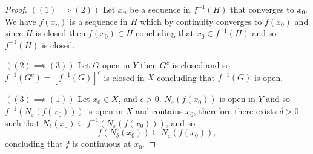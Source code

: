 \documentclass[11pt,openany]{book}
\theoremstyle{plain}
\theoremstyle{definition}
\theoremstyle{remark}
\newcommand{\eps}{\varepsilon}
\begin{document}
\begin{proof}
    $((1)\implies (2))$ 
    Let $x_n$ be a sequence in $f^{-1}(H)$ that converges to $x_0$. We have $f(x_n)$ is a sequence in $H$ which by continuity converges to $f(x_0)$ and since $H$ is closed then $f(x_0)\in H$ concluding that $x_0\in f^{-1}(H)$ and so $f^{-1}(H)$ is closed.

    $((2)\implies (3))$ Let $G$ open in $Y$ then $G^c$ is closed and so $f^{-1}(G^c)=[f^{-1}(G)]^c$ is closed in $X$ concluding that $f^{-1}(G)$ is open.

    $((3)\implies (1))$ 
    Let $x_0\in X$, and $\epsilon>0$. $N_{\eps}(f(x_0))$ is open in $Y$ and so $f^{-1}(N_{\eps}(f(x_0)))$ is open in $X$ and contains $x_0$, therefore there exists $\delta>0$ such that
    $N_{\delta}(x_0)\subseteq f^{-1}(N_\eps(f(x_0)))$, and so
    $$f(N_{\delta}(x_0))\subseteq N_{\eps}(f(x_0)),$$
    concluding that $f$ is continuous at $x_0$.
\end{proof}
\end{document}
